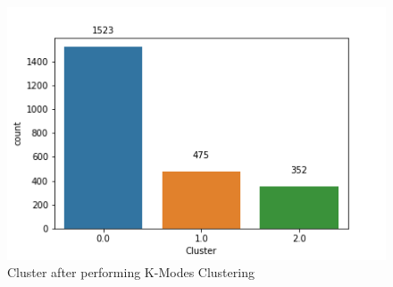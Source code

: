 \documentclass[11pt]{article}
\begin{document}
\begin{figure}[h]
\centerline{\includegraphics[scale=0.65]{kmodeCluster.png}}
\caption{Cluster after performing K-Modes Clustering}
\label{fig:kModeCluster}
\end{figure}
\end{document}
